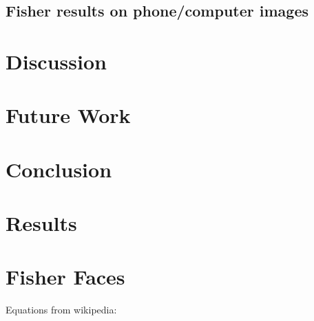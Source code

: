 
\subsection{Fisher results on phone/computer images}



\section{Discussion} %



\section{Future Work} %



\section{Conclusion}











\section{Results}




\section{Fisher Faces}

Equations from wikipedia:

